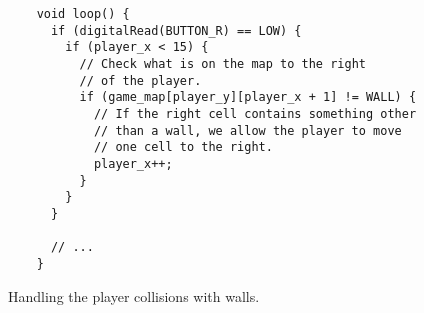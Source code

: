 \documentclass[../sparc.tex]{subfiles}
\begin{document}
\begin{listing}[H]
  \begin{verbatim}
    void loop() {
      if (digitalRead(BUTTON_R) == LOW) {
        if (player_x < 15) {
          // Check what is on the map to the right
          // of the player.
          if (game_map[player_y][player_x + 1] != WALL) {
            // If the right cell contains something other
            // than a wall, we allow the player to move
            // one cell to the right.
            player_x++;
          }
        }
      }

      // ...
    }
  \end{verbatim}
  \caption{Handling the player collisions with walls.}
  \label{listing:game-dev-map-collisions-00}
\end{listing}
\end{document}
